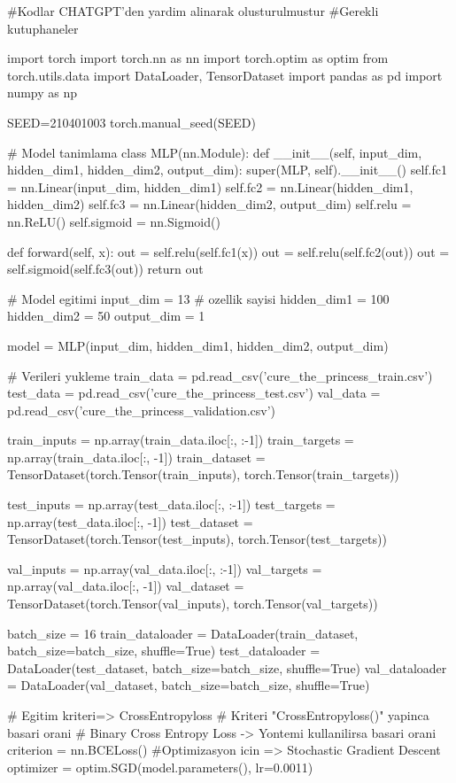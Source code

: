 \documentclass[11pt]{article}
\begin{document}
\begin{python}
#Kodlar CHATGPT'den yardim alinarak olusturulmustur
#Gerekli kutuphaneler

import torch
import torch.nn as nn
import torch.optim as optim
from torch.utils.data import DataLoader, TensorDataset
import pandas as pd
import numpy as np

SEED=210401003
torch.manual_seed(SEED)

# Model tanimlama
class MLP(nn.Module):
    def __init__(self, input_dim, hidden_dim1, hidden_dim2, output_dim):
        super(MLP, self).__init__()
        self.fc1 = nn.Linear(input_dim, hidden_dim1)
        self.fc2 = nn.Linear(hidden_dim1, hidden_dim2)
        self.fc3 = nn.Linear(hidden_dim2, output_dim)
        self.relu = nn.ReLU()
        self.sigmoid = nn.Sigmoid()
        
    def forward(self, x):
        out = self.relu(self.fc1(x))
        out = self.relu(self.fc2(out))
        out = self.sigmoid(self.fc3(out))
        return out

# Model egitimi
input_dim = 13 # ozellik sayisi
hidden_dim1 = 100
hidden_dim2 = 50
output_dim = 1

model = MLP(input_dim, hidden_dim1, hidden_dim2, output_dim)

# Verileri yukleme
train_data = pd.read_csv('cure_the_princess_train.csv')
test_data = pd.read_csv('cure_the_princess_test.csv')
val_data = pd.read_csv('cure_the_princess_validation.csv')

train_inputs = np.array(train_data.iloc[:, :-1])
train_targets = np.array(train_data.iloc[:, -1])
train_dataset = TensorDataset(torch.Tensor(train_inputs), torch.Tensor(train_targets))

test_inputs = np.array(test_data.iloc[:, :-1])
test_targets = np.array(test_data.iloc[:, -1])
test_dataset = TensorDataset(torch.Tensor(test_inputs), torch.Tensor(test_targets))

val_inputs = np.array(val_data.iloc[:, :-1])
val_targets = np.array(val_data.iloc[:, -1])
val_dataset = TensorDataset(torch.Tensor(val_inputs), torch.Tensor(val_targets))

batch_size = 16
train_dataloader = DataLoader(train_dataset, batch_size=batch_size, shuffle=True)
test_dataloader = DataLoader(test_dataset, batch_size=batch_size, shuffle=True)
val_dataloader = DataLoader(val_dataset, batch_size=batch_size, shuffle=True)

# Egitim kriteri=> CrossEntropyloss
# Kriteri  "CrossEntropyloss()" yapinca basari orani %
# Binary Cross Entropy Loss -> Yontemi kullanilirsa basari orani %
criterion = nn.BCELoss()
#Optimizasyon icin => Stochastic Gradient Descent
optimizer = optim.SGD(model.parameters(), lr=0.0011)



\end{python}
\end{document}
